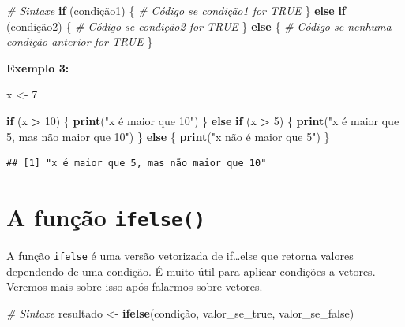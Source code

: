 \documentclass[
]{book}
\newenvironment{Shaded}{\begin{snugshade}}{\end{snugshade}}
\newcommand{\CommentTok}[1]{\textcolor[rgb]{0.56,0.35,0.01}{\textit{#1}}}
\newcommand{\ControlFlowTok}[1]{\textcolor[rgb]{0.13,0.29,0.53}{\textbf{#1}}}
\newcommand{\DecValTok}[1]{\textcolor[rgb]{0.00,0.00,0.81}{#1}}
\newcommand{\FunctionTok}[1]{\textcolor[rgb]{0.13,0.29,0.53}{\textbf{#1}}}
\newcommand{\NormalTok}[1]{#1}
\newcommand{\OtherTok}[1]{\textcolor[rgb]{0.56,0.35,0.01}{#1}}
\newcommand{\SpecialCharTok}[1]{\textcolor[rgb]{0.81,0.36,0.00}{\textbf{#1}}}
\newcommand{\StringTok}[1]{\textcolor[rgb]{0.31,0.60,0.02}{#1}}
\theoremstyle{definition}
\theoremstyle{definition}
\theoremstyle{definition}
\theoremstyle{definition}
\theoremstyle{remark}
\begin{document}
\begin{Shaded}
\begin{Highlighting}[]
\CommentTok{\# Sintaxe}
\ControlFlowTok{if}\NormalTok{ (condição1) \{}
      \CommentTok{\# Código se condição1 for TRUE}
\NormalTok{\} }\ControlFlowTok{else} \ControlFlowTok{if}\NormalTok{ (condição2) \{}
      \CommentTok{\# Código se condição2 for TRUE}
\NormalTok{\} }\ControlFlowTok{else}\NormalTok{ \{}
      \CommentTok{\# Código se nenhuma condição anterior for TRUE}
\NormalTok{\}}
\end{Highlighting}
\end{Shaded}

\textbf{Exemplo 3:}

\begin{Shaded}
\begin{Highlighting}[]
\NormalTok{x }\OtherTok{\textless{}{-}} \DecValTok{7}

\ControlFlowTok{if}\NormalTok{ (x }\SpecialCharTok{\textgreater{}} \DecValTok{10}\NormalTok{) \{}
      \FunctionTok{print}\NormalTok{(}\StringTok{"x é maior que 10"}\NormalTok{)}
\NormalTok{\} }\ControlFlowTok{else} \ControlFlowTok{if}\NormalTok{ (x }\SpecialCharTok{\textgreater{}} \DecValTok{5}\NormalTok{) \{}
        \FunctionTok{print}\NormalTok{(}\StringTok{"x é maior que 5, mas não maior que 10"}\NormalTok{)}
\NormalTok{\} }\ControlFlowTok{else}\NormalTok{ \{}
        \FunctionTok{print}\NormalTok{(}\StringTok{"x não é maior que 5"}\NormalTok{)}
\NormalTok{\}}
\end{Highlighting}
\end{Shaded}

\begin{verbatim}
## [1] "x é maior que 5, mas não maior que 10"
\end{verbatim}

\section{\texorpdfstring{A função \texttt{ifelse()}}{A função ifelse()}}\label{a-funuxe7uxe3o-ifelse}

A função \texttt{ifelse} é uma versão vetorizada de if\ldots else que retorna valores dependendo de uma condição. É muito útil para aplicar condições a vetores. Veremos mais sobre isso após falarmos sobre vetores.

\begin{Shaded}
\begin{Highlighting}[]
\CommentTok{\# Sintaxe}
\NormalTok{resultado }\OtherTok{\textless{}{-}} \FunctionTok{ifelse}\NormalTok{(condição, valor\_se\_true, valor\_se\_false)}
\end{Highlighting}
\end{Shaded}
\end{document}
